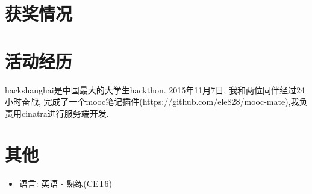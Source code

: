 \documentclass[UTF8]{resume}
\begin{document}
\section{\faHeartO 获奖情况}

\section{\faUsers 活动经历}
hackshanghai是中国最大的大学生hackthon. 2015年11月7日, 我和两位同伴经过24小时奋战, 完成了一个mooc笔记插件(https://github.com/ele828/mooc-mate),我负责用cinatra进行服务端开发. 

\section{\faInfo 其他}
\begin{itemize}[parsep=0.5ex]
  \item 语言: 英语 - 熟练(CET6)
\end{itemize}

%
%
\end{document}
